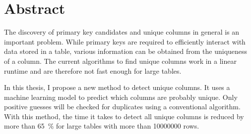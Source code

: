 \begingroup
\let\clearpage\relax
\let\cleardoublepage\relax
\let\cleardoublepage\relax
\chapter*{Abstract}
The discovery of primary key candidates and unique columns in general is an important problem. While primary keys are required to efficiently interact with data stored in a table, various information can be obtained from the uniqueness of a column. %
The current algorithms to find unique columns work in a linear runtime and are therefore not fast enough for large tables.

In this thesis, I propose a new method to detect unique columns. It uses a machine learning model to predict which columns are probably unique. Only positive guesses will be checked for duplicates using a conventional algorithm. With this method, the time it takes to detect all unique columns is reduced by more than \SI{65}{\percent} for large tables with more than \num{10000000} rows. %


\endgroup

